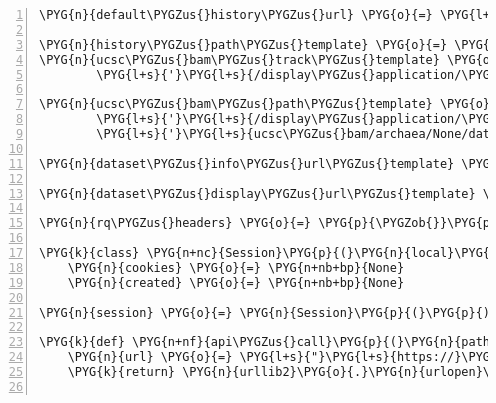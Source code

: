 \begin{Verbatim}[commandchars=\\\{\},numbers=left,firstnumber=1,stepnumber=5]
\PYG{n}{default\PYGZus{}history\PYGZus{}url} \PYG{o}{=} \PYG{l+s}{'}\PYG{l+s}{https://main.g2.bx.psu.edu/u/dcgdftvcdv/h/rna-seqlyze}\PYG{l+s}{'}

\PYG{n}{history\PYGZus{}path\PYGZus{}template} \PYG{o}{=} \PYG{l+s}{'}\PYG{l+s}{/api/histories/\PYGZob{}history\PYGZcb{}/contents}\PYG{l+s}{'}
\PYG{n}{ucsc\PYGZus{}bam\PYGZus{}track\PYGZus{}template} \PYG{o}{=} \PYGZbs{}
        \PYG{l+s}{'}\PYG{l+s}{/display\PYGZus{}application/\PYGZob{}dataset\PYGZcb{}/ucsc\PYGZus{}bam/archaea/None/param/track}\PYG{l+s}{'}

\PYG{n}{ucsc\PYGZus{}bam\PYGZus{}path\PYGZus{}template} \PYG{o}{=} \PYGZbs{}
        \PYG{l+s}{'}\PYG{l+s}{/display\PYGZus{}application/\PYGZob{}dataset\PYGZcb{}/}\PYG{l+s}{'} \PYGZbs{}
        \PYG{l+s}{'}\PYG{l+s}{ucsc\PYGZus{}bam/archaea/None/data/galaxy\PYGZus{}\PYGZob{}dataset\PYGZcb{}.bam}\PYG{l+s}{'}

\PYG{n}{dataset\PYGZus{}info\PYGZus{}url\PYGZus{}template} \PYG{o}{=} \PYG{l+s}{"}\PYG{l+s}{/api/histories/\PYGZob{}history\PYGZcb{}/contents/\PYGZob{}dataset\PYGZcb{}}\PYG{l+s}{"}

\PYG{n}{dataset\PYGZus{}display\PYGZus{}url\PYGZus{}template} \PYG{o}{=} \PYG{l+s}{"}\PYG{l+s}{/datasets/\PYGZob{}dataset\PYGZcb{}/display}\PYG{l+s}{"}

\PYG{n}{rq\PYGZus{}headers} \PYG{o}{=} \PYG{p}{\PYGZob{}}\PYG{p}{\PYGZcb{}}

\PYG{k}{class} \PYG{n+nc}{Session}\PYG{p}{(}\PYG{n}{local}\PYG{p}{)}\PYG{p}{:}
    \PYG{n}{cookies} \PYG{o}{=} \PYG{n+nb+bp}{None}
    \PYG{n}{created} \PYG{o}{=} \PYG{n+nb+bp}{None}

\PYG{n}{session} \PYG{o}{=} \PYG{n}{Session}\PYG{p}{(}\PYG{p}{)}

\PYG{k}{def} \PYG{n+nf}{api\PYGZus{}call}\PYG{p}{(}\PYG{n}{path}\PYG{p}{)}\PYG{p}{:}
    \PYG{n}{url} \PYG{o}{=} \PYG{l+s}{"}\PYG{l+s}{https://}\PYG{l+s}{"} \PYG{o}{+} \PYG{n}{hostname} \PYG{o}{+} \PYG{n}{path}
    \PYG{k}{return} \PYG{n}{urllib2}\PYG{o}{.}\PYG{n}{urlopen}\PYG{p}{(}\PYG{n}{url} \PYG{o}{+} \PYG{l+s}{"}\PYG{l+s}{?key=}\PYG{l+s}{"} \PYG{o}{+} \PYG{n}{api\PYGZus{}key}\PYG{p}{)}\PYG{o}{.}\PYG{n}{read}\PYG{p}{(}\PYG{p}{)}


\end{Verbatim}
